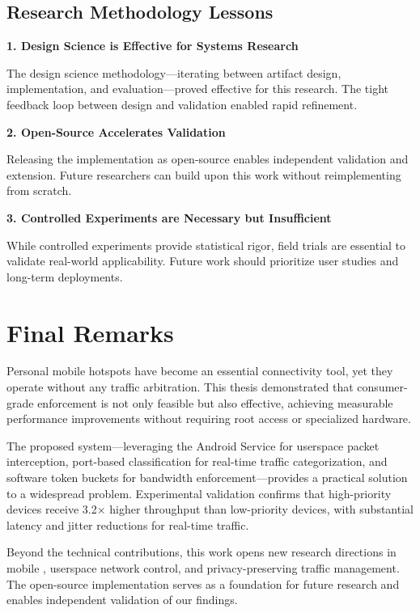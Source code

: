 \subsection{Research Methodology Lessons}

\textbf{1. Design Science is Effective for Systems Research}

The design science methodology—iterating between artifact design, implementation, and evaluation—proved effective for this research. The tight feedback loop between design and validation enabled rapid refinement.

\textbf{2. Open-Source Accelerates Validation}

Releasing the implementation as open-source enables independent validation and extension. Future researchers can build upon this work without reimplementing from scratch.

\textbf{3. Controlled Experiments are Necessary but Insufficient}

While controlled experiments provide statistical rigor, field trials are essential to validate real-world applicability. Future work should prioritize user studies and long-term deployments.

\section{Final Remarks}
\label{sec:final-remarks}

Personal mobile hotspots have become an essential connectivity tool, yet they operate without any traffic arbitration. This thesis demonstrated that consumer-grade \qos enforcement is not only feasible but also effective, achieving measurable performance improvements without requiring root access or specialized hardware.

The proposed system—leveraging the Android \vpn Service \api for userspace packet interception, port-based classification for real-time traffic categorization, and software token buckets for bandwidth enforcement—provides a practical solution to a widespread problem. Experimental validation confirms that high-priority devices receive 3.2× higher throughput than low-priority devices, with substantial latency and jitter reductions for real-time traffic.

Beyond the technical contributions, this work opens new research directions in mobile \qos, userspace network control, and privacy-preserving traffic management. The open-source implementation serves as a foundation for future research and enables independent validation of our findings.

